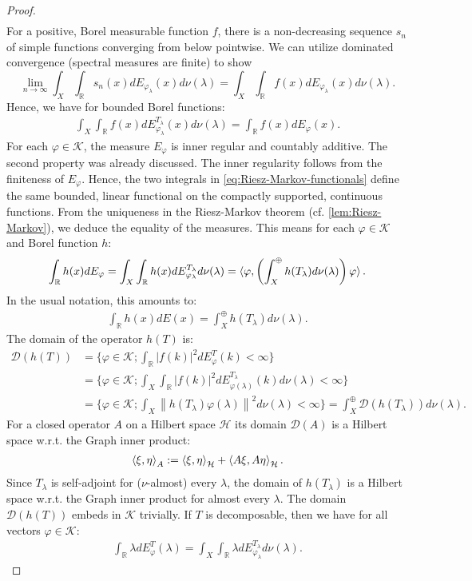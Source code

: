 \documentclass[12pt]{article}
\def\RR{{\mathbb R}}
\def\D{{\mathcal D}}
\def\H{{\mathcal H}}
\def\K{{\mathcal K}}
\def\l{\lambda}
\newcommand{\norm}[1]{\left\lVert#1\right\rVert}
\theoremstyle{remark}
\begin{document}
\begin{proof}
\begin{align*}
				\end{align*}
			For a positive, Borel measurable function $f$, there is a non-decreasing sequence $s_n$ of simple functions converging from below pointwise. We can utilize dominated convergence (spectral measures are finite) to show 	
			$$\lim\limits_{n\rightarrow \infty}\int_X \int_\RR s_n(x) dE_{\varphi_\l}(x) d\nu(\l)=\int_X \int_\RR f(x) dE_{\varphi_\l}(x) d\nu(\l).$$ 
			Hence, we have for bounded Borel functions:
				\begin{align}\label{eq:Riesz-Markov-functionals}
					\int_X \int_\RR f(x) dE^{T_\l}_{\varphi_\l}(x) d\nu(\l)
				=\int_\RR f(x) dE_\varphi(x).
				\end{align}
			For each $\varphi \in \K$, the measure $E_\varphi$ is inner regular and countably additive. The second property was already discussed. The inner regularity follows from the finiteness of $E_\varphi$. Hence, the two integrals in \eqref{eq:Riesz-Markov-functionals} define the same bounded, linear functional on the compactly supported, continuous functions. From the uniqueness in the Riesz-Markov theorem (cf.\! \autoref{lem:Riesz-Markov}), we deduce the equality of the measures. This means for each $\varphi \in \K$ and Borel function $h$:
				\begin{align*}
					\int_\RR h(x)dE_\varphi=\int_X\int_\RR h(x)dE_{\varphi_\l}^{T_\l}d\nu(\l)=\braket{\varphi, \left( \int^\oplus_X h(T_\l)d\nu(\l) \right)\varphi}.
				\end{align*}
			In the usual notation, this amounts to:
				\begin{align*}
					\int_\RR h(x)dE(x)=\int^\oplus_X h(T_\l) d\nu(\l).
				\end{align*}
			The domain of the operator $h(T)$ is:
				\begin{align*}
					\D(h(T))&=\{\varphi\in \K; \int_\RR |f(k)|^2 dE_{\varphi}^T(k)<\infty   \}\\
					&=\{\varphi\in \K; \int_X\int_\RR |f(k)|^2 dE_{\varphi(\l)}^{T_\l}(k)d\nu(\l)<\infty   \}\\
					&= \{\varphi\in \K; \int_X\norm{h(T_\l)\varphi(\l)}^2 d\nu(\l)<\infty   \}  
					=\int^\oplus_X \D(h(T_\l))d\nu(\l).
				\end{align*}
			For a closed operator $A$ on a Hilbert space $\H$ its domain $\D(A)$ is a Hilbert space   w.r.t. the Graph inner product:
				\begin{align*}
					\braket{\xi,\eta}_{A}:=\braket{\xi,\eta}_{\H}+\braket{A\xi,A\eta}_{\H}.
				\end{align*}
			Since $T_\l$ is self-adjoint for ($\nu$-almost) every $\l$, the domain of $h(T_\l)$ is a Hilbert space w.r.t. the Graph inner product for almost every $\l$.  The domain $\D(h(T))$ embeds in $\K$ trivially. 
			If $T$ is decomposable, then we have for all vectors $\varphi \in \K$:
				\begin{align*}
					\int_\RR \l dE_\varphi^T(\l)=\int_X\int_\RR \l dE_{\varphi_\l}^{T_\l}d\nu(\l).
				\end{align*}
			

\end{proof}
\end{document}
